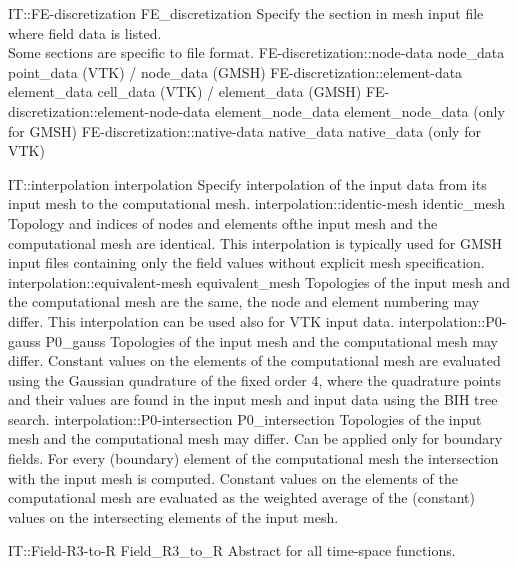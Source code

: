 \begin{SelectionType}
	{IT::FE-discretization}
	{FE{\_}discretization}
	{{{Specify the section in mesh input file where field data is listed.}\\{
Some sections are specific to file format.}%
}}
		\SelectionItem
			{FE-discretization::node-data}
			{node{\_}data}
			{{{point{\_}data (VTK) / node{\_}data (GMSH)}%
}}
		\SelectionItem
			{FE-discretization::element-data}
			{element{\_}data}
			{{{cell{\_}data (VTK) / element{\_}data (GMSH)}%
}}
		\SelectionItem
			{FE-discretization::element-node-data}
			{element{\_}node{\_}data}
			{{{element{\_}node{\_}data (only for GMSH)}%
}}
		\SelectionItem
			{FE-discretization::native-data}
			{native{\_}data}
			{{{native{\_}data (only for VTK)}%
}}
\end{SelectionType}
\begin{SelectionType}
	{IT::interpolation}
	{interpolation}
	{{{Specify interpolation of the input data from its input mesh to the computational mesh.}%
}}
		\SelectionItem
			{interpolation::identic-mesh}
			{identic{\_}mesh}
			{{{Topology and indices of nodes and elements ofthe input mesh and the computational mesh are identical.
This interpolation is typically used for GMSH input files containing only the field values without explicit mesh specification.}%
}}
		\SelectionItem
			{interpolation::equivalent-mesh}
			{equivalent{\_}mesh}
			{{{Topologies of the input mesh and the computational mesh are the same, the node and element numbering may differ.
This interpolation can be used also for VTK input data.}%
}}
		\SelectionItem
			{interpolation::P0-gauss}
			{P0{\_}gauss}
			{{{Topologies of the input mesh and the computational mesh may differ.
Constant values on the elements of the computational mesh are evaluated using the Gaussian quadrature of the fixed order 4, where the quadrature points and their values are found in the input mesh and input data using the BIH tree search.}%
}}
		\SelectionItem
			{interpolation::P0-intersection}
			{P0{\_}intersection}
			{{{Topologies of the input mesh and the computational mesh may differ.
Can be applied only for boundary fields.
For every (boundary) element of the computational mesh the intersection with the input mesh is computed.
Constant values on the elements of the computational mesh are evaluated as the weighted average of the (constant) values on the intersecting elements of the input mesh.}%
}}
\end{SelectionType}
\begin{AbstractType}
	{IT::Field-R3-to-R}
	{Field{\_}R3{\_}to{\_}R}
	{}
	{{{Abstract for all time-space functions.}%
}}
\end{AbstractType}
